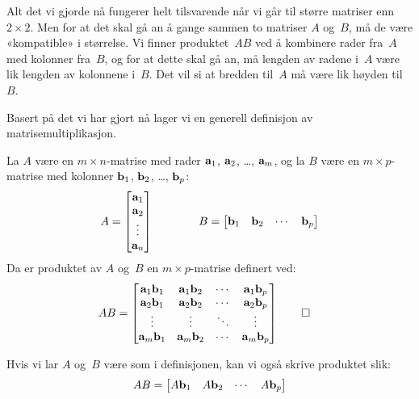 Alt det vi gjorde nå fungerer helt tilsvarende når vi går til større
matriser enn $2 \times 2$.  Men for at det skal gå an å gange sammen
to matriser $A$ og~$B$, må de være «kompatible» i størrelse.  Vi
finner produktet~$AB$ ved å kombinere rader fra~$A$ med kolonner
fra~$B$, og for at dette skal gå an, må lengden av radene i~$A$ være
lik lengden av kolonnene i~$B$.  Det vil si at bredden til~$A$ må være
lik høyden til~$B$.

Basert på det vi har gjort nå lager vi en generell definisjon av
matrisemultiplikasjon.

\begin{defn}
La $A$ være en $m \times n$-matrise med rader
$\mathbf{a}_1$, $\mathbf{a}_2$, \ldots, $\mathbf{a}_m$,
og la $B$ være en $m \times p$-matrise med kolonner
$\mathbf{b}_1$, $\mathbf{b}_2$, \ldots, $\mathbf{b}_p$:
\[
A = \begin{bmatrix} \mathbf{a}_1 \\ \mathbf{a}_2 \\ \vdots \\ \mathbf{a}_n \end{bmatrix}
\qquad\qquad
B = \begin{bmatrix} \mathbf{b}_1 & \mathbf{b}_2 & \cdots & \mathbf{b}_p \end{bmatrix}
\]
Da er produktet av $A$ og~$B$ en $m \times p$-matrise definert ved:
\begin{align*}
AB &=
\begin{bmatrix}
\mathbf{a}_1 \mathbf{b}_1 & \mathbf{a}_1 \mathbf{b}_2 & \cdots & \mathbf{a}_1 \mathbf{b}_p \\
\mathbf{a}_2 \mathbf{b}_1 & \mathbf{a}_2 \mathbf{b}_2 & \cdots & \mathbf{a}_2 \mathbf{b}_p \\
\vdots          & \vdots          & \ddots & \vdots          \\
\mathbf{a}_m \mathbf{b}_1 & \mathbf{a}_m \mathbf{b}_2 & \cdots & \mathbf{a}_m \mathbf{b}_p
\end{bmatrix}
\qedhere
\end{align*}
\end{defn}

Hvis vi lar $A$ og~$B$ være som i definisjonen, kan vi også skrive
produktet slik:
\[
AB = \begin{bmatrix} A \mathbf{b}_1 & A \mathbf{b}_2 & \cdots & A \mathbf{b}_p \end{bmatrix}
\]

